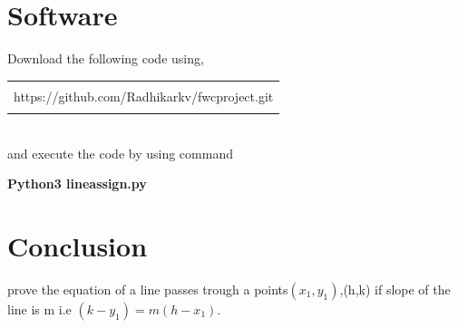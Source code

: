 \documentclass[journal,12pt,twocolumn]{IEEEtran}
\begin{document}
\section{Software}
Download the following code using,
\begin{table}[h]
    \centering
    \begin{tabular}{|c|}
    \hline \\
         https://github.com/Radhikarkv/fwcproject.git  \\
         \\
\hline
    \end{tabular}
\end{table}
\\
and execute the code by using command
\begin{center}
\textbf{Python3 lineassign.py}\\
\end{center}

\section{Conclusion}
prove the equation of a line passes trough a points$(x_1,y_1)$,(h,k) if slope of the line is m i.e $(k-y_1)=m(h-x_1)$.
\end{document}
